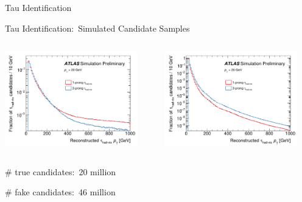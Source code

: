 \documentclass[11pt, xcolor={dvipsnames}, aspectratio=169, notes]{beamer}
\begin{document}

\begin{frame}[standout]
  Tau Identification
\end{frame}


\begin{frame}{Tau Identification:\ Simulated \tauhadvis Candidate Samples}
  \begin{columns}
    \centering\footnotesize

    \allbold{$\gamma^* \to \tau^+\tau^-$}

    \includegraphics[width=0.9\textwidth]{tauid/pubnote/taupt_gammastar}

    \centering\footnotesize


    \includegraphics[width=0.9\textwidth]{tauid/pubnote/taupt_dijet}
  \end{columns}

  \footnotesize

  \# true \tauhadvis candidates:\ 20 million

  \# fake \tauhadvis candidates:\ 46 million
\end{frame}
\end{document}
